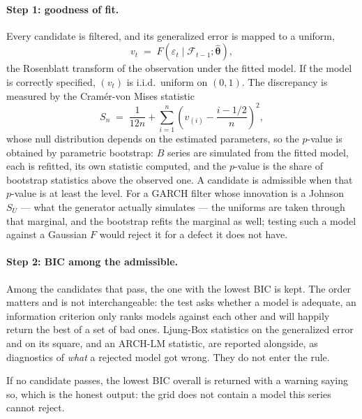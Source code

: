 \documentclass[11pt]{article}
\begin{document}
\paragraph{Step 1: goodness of fit.} Every candidate is filtered, and its
generalized error is mapped to a uniform,
\begin{equation}\label{eq:rosenblatt}
  v_t \;=\; F\!\left(\varepsilon_t \mid \mathcal F_{t-1}; \hat{\boldsymbol\theta}\right) ,
\end{equation}
the Rosenblatt transform of the observation under the fitted model. If the
model is correctly specified, $(v_t)$ is i.i.d.\ uniform on $(0,1)$. The
discrepancy is measured by the Cramér-von Mises statistic
\begin{equation}\label{eq:cvm}
  S_n \;=\; \frac{1}{12n} + \sum_{i=1}^{n}\left(v_{(i)} - \frac{i - 1/2}{n}\right)^{\!2} ,
\end{equation}
whose null distribution depends on the estimated parameters, so the $p$-value
is obtained by parametric bootstrap: $B$ series are simulated from the fitted
model, each is refitted, its own statistic computed, and the $p$-value is the
share of bootstrap statistics above the observed one. A candidate is admissible
when that $p$-value is at least the level. For a GARCH filter whose innovation
is a Johnson $S_U$ --- what the generator actually simulates --- the uniforms are
taken through that marginal, and the bootstrap refits the marginal as well;
testing such a model against a Gaussian $F$ would reject it for a defect it
does not have.

\paragraph{Step 2: BIC among the admissible.} Among the candidates that pass,
the one with the lowest BIC is kept. The order matters and is not
interchangeable: the test asks whether a model is adequate, an information
criterion only ranks models against each other and will happily return the best
of a set of bad ones. Ljung-Box statistics on the generalized error and on its
square, and an ARCH-LM statistic, are reported alongside, as diagnostics of
\emph{what} a rejected model got wrong. They do not enter the rule.

If no candidate passes, the lowest BIC overall is returned with a warning
saying so, which is the honest output: the grid does not contain a model this
series cannot reject.
\end{document}
